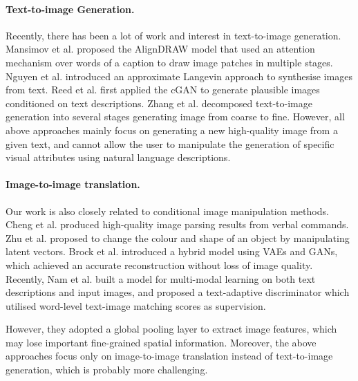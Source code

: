 \paragraph{Text-to-image Generation.} Recently, there has been a lot of work and interest in text-to-image generation. Mansimov et al. \cite{mansimov2015generating} proposed the AlignDRAW model that used an attention mechanism over words of a caption to draw image patches in multiple stages. Nguyen et al. \cite{nguyen2017plug} introduced an approximate Langevin approach to synthesise images from text. Reed et al. \cite{reed2016generative} first applied the cGAN to generate plausible images conditioned on text descriptions. Zhang et al. \cite{zhang2017stackgan} decomposed text-to-image generation into several stages generating image from coarse to fine. However, all above approaches mainly focus on generating a new high-quality image from a given text, and cannot allow the user to manipulate the generation of specific visual attributes using natural language descriptions.

\paragraph{Image-to-image translation.} Our work is also closely related to conditional image manipulation methods. Cheng et al. \cite{cheng2014imagespirit} produced high-quality image parsing results from verbal commands. Zhu et al. \cite{zhu2016generative} proposed to change the colour and shape of an object by manipulating latent vectors. Brock et al. \cite{brock2016neural} introduced a hybrid model using VAEs \cite{kingma2014semi} and GANs, which achieved an accurate reconstruction without loss of {image quality}. Recently, Nam et al. \cite{nam2018text} built a model for multi-modal learning on both text descriptions and input images, and proposed a text-adaptive discriminator which utilised word-level text-image matching scores as supervision.

However, they adopted a global pooling layer to extract image features, which may lose important fine-grained spatial information. Moreover, the above approaches focus only on image-to-image translation instead of text-to-image generation, which is {probably} more challenging.  

